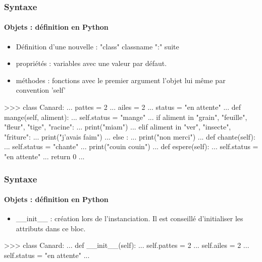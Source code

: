 \begin{frame}[fragile]
\frametitle{Syntaxe}
\framesubtitle{Objets : définition en Python}
\begin{itemize}
 \item Définition d'une nouvelle : "class" classname ":" suite
 \item propriétés : variables avec une valeur par défaut. 
 \item méthodes : fonctions avec le premier argument l'objet lui même par convention 'self'
\end{itemize}
\begin{pythonConsole}
>>> class Canard: 
...    pattes = 2
...    ailes = 2
...    status = "en attente"
...    def mange(self, aliment):
...       self.status = "mange"
...       if aliment in {"grain", "feuille", "fleur", "tige", "racine"}: 
...          print("miam")
...       elif aliment in {"ver", "insecte", "friture"}: 
...          print("j'avais faim")
...       else : 
...          print("non merci")
...    def chante(self): 
...       self.status = "chante"
...       print("couin couin")
...    def espere(self): 
...       self.status = "en attente"
...       return 0 
...
\end{pythonConsole}
\end{frame}
\begin{frame}[fragile]
\frametitle{Syntaxe}
\framesubtitle{Objets : définition en Python}
\begin{itemize}
 \item \_\_init\_\_ : création lors de l'instanciation. Il est conseillé d'initialiser les attributs dans ce bloc. 
\end{itemize}
\begin{pythonConsole}
>>> class Canard: 
...    def __init__(self): 
...       self.pattes = 2
...       self.ailes = 2
...       self.status = "en attente"
...
\end{pythonConsole}
\end{frame}
